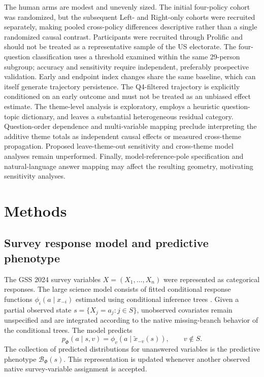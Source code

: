 \documentclass[11pt]{article}
\newcommand{\Ph}{\Phi}
\begin{document}
The human arms are modest and unevenly sized. The initial four-policy cohort was randomized, but the subsequent Left- and Right-only cohorts were recruited separately, making pooled cross-policy differences descriptive rather than a single randomized causal contrast. Participants were recruited through Prolific and should not be treated as a representative sample of the US electorate. The four-question classification uses a threshold examined within the same 29-person subgroup; accuracy and sensitivity require independent, preferably prospective validation. Early and endpoint index changes share the same baseline, which can itself generate trajectory persistence. The Q4-filtered trajectory is explicitly conditioned on an early outcome and must not be treated as an unbiased effect estimate. The theme-level analysis is exploratory, employs a heuristic question-topic dictionary, and leaves a substantial heterogeneous residual category. Question-order dependence and multi-variable mapping preclude interpreting the additive theme totals as independent causal effects or measured cross-theme propagation. Proposed leave-theme-out sensitivity and cross-theme model analyses remain unperformed. Finally, model-reference-pole specification and natural-language answer mapping may affect the resulting geometry, motivating sensitivity analyses.

\section*{Methods}

\subsection*{Survey response model and predictive phenotype}
The GSS 2024 survey variables $X=(X_1,\ldots,X_n)$ were represented as categorical responses. The large science model consists of fitted conditional response functions $\phi_i(a\mid x_{-i})$ estimated using conditional inference trees \citep{hothorn2006,dahal2026}. Given a partial observed state $s=\{X_j=a_j:j\in S\}$, unobserved covariates remain unspecified and are integrated according to the native missing-branch behavior of the conditional trees. The model predicts
\begin{equation}
p_{\Ph}(a\mid s,v)=\phi_v(a\mid \widetilde{x}_{-v}(s)), \qquad v\notin S.
\end{equation}
The collection of predicted distributions for unanswered variables is the predictive phenotype $\mathcal{B}_{\Ph}(s)$. This representation is updated whenever another observed native survey-variable assignment is accepted.
\end{document}
